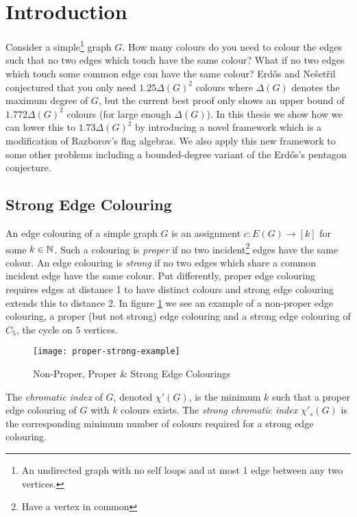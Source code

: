 \chapter*{Introduction}

Consider a simple\footnote{An undirected graph with no self loops and at most 1 edge between any two
vertices.} graph $G$. How many colours do you need to colour the edges such that no two edges which touch
have the same colour? What if no two edges which touch some common edge can have the same colour?
Erd\H{o}s and Nešetřil conjectured that you only need $1.25\Delta(G)^2$ colours where $\Delta(G)$ denotes the maximum degree of $G$, but
the current best proof only shows an upper bound of $1.772\Delta(G)^2$ colours (for large enough $\Delta(G)$). In this thesis
we show how we can lower this to $1.73\Delta(G)^2$ by introducing a novel framework
which is a modification of Razborov's flag algebras. We also apply this new framework
to some other problems including a bounded-degree variant of the
Erd\H{o}s's pentagon conjecture.

\section*{Strong Edge Colouring}
\label{sec:intro_strong_edge_coloring}

An edge colouring of a simple graph $G$ is an assignment $c\colon E(G) \to [k]$
for some $k\in\mathbb{N}$. Such a colouring is \textit{proper} if no two incident\footnote{Have a vertex in common}
edges have the same colour.
An edge colouring is \textit{strong} if no two edges which share a common incident edge have
the same colour. Put differently, proper edge colouring requires edges at distance 1 to have distinct
colours and strong edge colouring extends this to distance 2.
In figure \ref{fig:proper-strong-example} we see an example of a non-proper edge colouring,
a proper (but not strong) edge colouring and a strong edge colouring of $C_5$, the cycle on $5$ vertices.

\begin{figure}[h]
    \centering
    \texttt{[image: proper-strong-example]}
    \caption{Non-Proper, Proper \& Strong Edge Colourings}
    \label{fig:proper-strong-example}
\end{figure}

The \textit{chromatic index} of $G$, denoted $\chi'(G)$, is the minimum $k$ such that a proper edge
colouring of $G$ with $k$ colours exists. The \textit{strong chromatic index} $\chi'_s(G)$
is the corresponding minimum number of colours required for a strong edge colouring.

